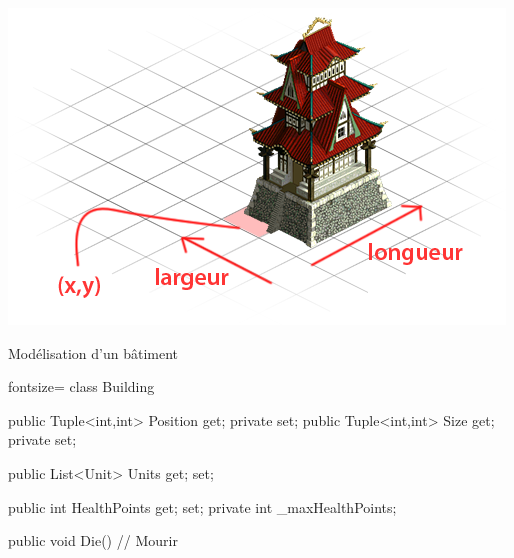 \begingroup
{}
\begin{frame}
  \begin{center}
    \vspace{1.4cm}\includegraphics[scale=0.4]{img/building.png}
  \end{center}
\end{frame}
\endgroup


\begin{frame}[fragile]
\begin{center}{\large Modélisation d'un bâtiment}\end{center}
        \begin{csharpcode*}{fontsize=\scriptsize}
class Building
{
    public Tuple<int,int> Position { get; private set; }
    public Tuple<int,int> Size { get; private set; }

    public List<Unit> Units { get; set; }

    public int HealthPoints { get; set; }
    private int _maxHealthPoints;

    public void Die()
    {
        // Mourir
    }
}
        \end{csharpcode*}
\end{frame}

